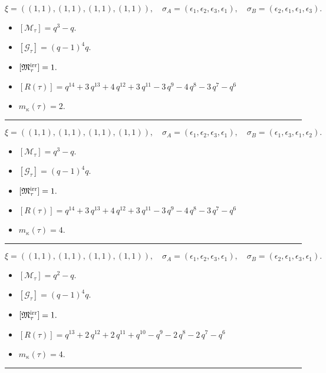 \documentclass[10pt,a4paper]{amsart}
\begin{document}
$$\xi = ({(1, 1), (1, 1), (1, 1)}, {(1, 1)}),\quad \sigma_A = ({{\epsilon_1}, {\epsilon_2}, {\epsilon_3}}, {{\epsilon_1}}),\quad \sigma_B = ({{\epsilon_2}, {\epsilon_1}, {\epsilon_1}}, {{\epsilon_3}}).$$

\begin{itemize}
 \item $[\mathcal{M}_{\tau}] = q^{3} - q .$

 \item $[\mathcal{G}_{\tau}] = {\left(q - 1\right)}^{4} q .$

 \item $[{\frak M}_{\tau}^{\textrm{irr}}] = 1 .$

 \item $[R(\tau)] = q^{14} + 3 \, q^{13} + 4 \, q^{12} + 3 \, q^{11} - 3 \, q^{9} - 4 \, q^{8} - 3 \, q^{7} - q^{6} $

 \item $m_{\kappa}(\tau) = 2 .$

 \end{itemize}
\noindent\rule{8cm}{0.4pt}

$$\xi = ({(1, 1), (1, 1), (1, 1)}, {(1, 1)}),\quad \sigma_A = ({{\epsilon_1}, {\epsilon_2}, {\epsilon_3}}, {{\epsilon_1}}),\quad \sigma_B = ({{\epsilon_1}, {\epsilon_3}, {\epsilon_1}}, {{\epsilon_2}}).$$

\begin{itemize}
 \item $[\mathcal{M}_{\tau}] = q^{3} - q .$

 \item $[\mathcal{G}_{\tau}] = {\left(q - 1\right)}^{4} q .$

 \item $[{\frak M}_{\tau}^{\textrm{irr}}] = 1 .$

 \item $[R(\tau)] = q^{14} + 3 \, q^{13} + 4 \, q^{12} + 3 \, q^{11} - 3 \, q^{9} - 4 \, q^{8} - 3 \, q^{7} - q^{6} $

 \item $m_{\kappa}(\tau) = 4 .$

 \end{itemize}
\noindent\rule{8cm}{0.4pt}

$$\xi = ({(1, 1), (1, 1), (1, 1)}, {(1, 1)}),\quad \sigma_A = ({{\epsilon_1}, {\epsilon_2}, {\epsilon_3}}, {{\epsilon_1}}),\quad \sigma_B = ({{\epsilon_2}, {\epsilon_1}, {\epsilon_3}}, {{\epsilon_1}}).$$

\begin{itemize}
 \item $[\mathcal{M}_{\tau}] = q^{2} - q .$

 \item $[\mathcal{G}_{\tau}] = {\left(q - 1\right)}^{4} q .$

 \item $[{\frak M}_{\tau}^{\textrm{irr}}] = 1 .$

 \item $[R(\tau)] = q^{13} + 2 \, q^{12} + 2 \, q^{11} + q^{10} - q^{9} - 2 \, q^{8} - 2 \, q^{7} - q^{6} $

 \item $m_{\kappa}(\tau) = 4 .$

 \end{itemize}
\noindent\rule{8cm}{0.4pt}
\end{document}
